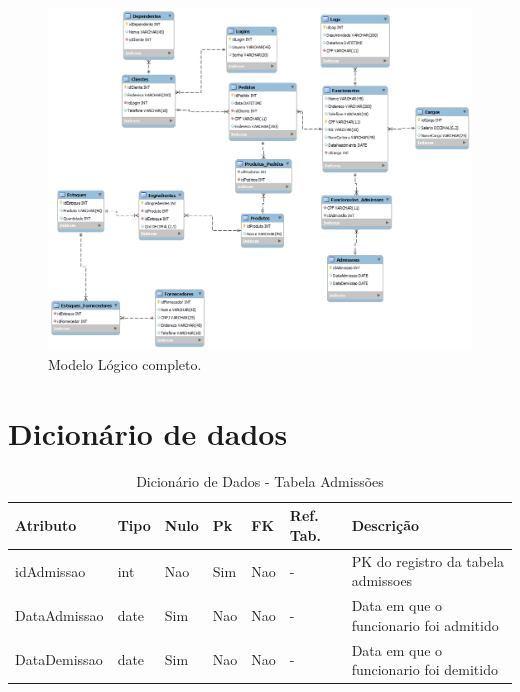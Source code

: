 \documentclass[
	12pt,				%
	openright,			%
	oneside,			%
	a4paper,			%
	chapter=TITLE,		%
	section=TITLE,		%
	english,			%
	brazil				%
	]{abntex2}
\begin{document}
    \begin{figure}[h]
         \centering
         \includegraphics[width=20cm,keepaspectratio, angle=90]{Imgs/ML_00}
         \caption{Modelo Lógico completo.}
         \label{ml_00}
    \end{figure}

    \section{Dicionário de dados}
    
    \begin{table}[htbp]
        \caption{Dicionário de Dados - Tabela Admissões}
        \label{tb1_dicionario_dados_admissoes}
        \begin{tabular}{|l|l|l|l|l|l|p{3cm}|}
            \hline 
            \textbf{Atributo} & 
            \textbf{Tipo} & 
            \textbf{Nulo} & 
            \textbf{Pk} & 
            \textbf{FK} & 
            \textbf{Ref. Tab.} & 
            \textbf{Descrição} \\ \hline
            idAdmissao & int & Nao & Sim & Nao & - & PK do registro da tabela admissoes \\ \hline
            DataAdmissao & date & Sim & Nao & Nao & - & Data em que o funcionario foi admitido \\ \hline
            DataDemissao & date & Sim & Nao & Nao & - & Data em que o funcionario foi demitido \\ \hline
        \end{tabular}        
    \end{table}
    
\end{document}
